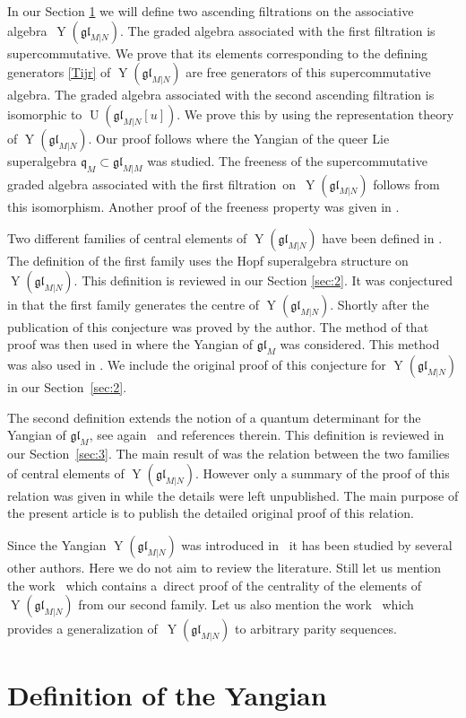 \documentclass[pdftex]{sigma}
\numberwithin{equation}{section}
\def\g{\glMN [u]}
\def\glMN{\mathfrak{gl}_{M|N}}
\def\Ug{\operatorname{U}(\g)}
\def\YMN{\operatorname{Y}(\glMN)}
\begin{document}
In our Section \ref{sec:1} we will define two ascending filtrations
on the associative algebra~$\YMN $. The
graded algebra associated with the first filtration
is supercommutative. We prove
that its elements corresponding to the defining
generators \eqref{Tijr} of $\YMN$ are free generators
of this supercommutative algebra.
The graded algebra associated with the second ascending
filtration is isomorphic to $\Ug $.
We prove this by using the representation theory of $\YMN $.
Our proof follows \cite{N2} where the Yangian of the queer Lie superalgebra
$\mathfrak{q}_{M}\subset\mathfrak{gl}_{M|M}$ was studied.
The freeness of the supercommutative graded algebra
associated with the first filtration~on~$\YMN$
follows from this isomorphism.
Another proof of the freeness property was given in \cite{G2}.

Two different families of central elements of $\YMN$
have been defined in \cite{N1}. The definition of the first family uses
the Hopf superalgebra structure on $\YMN $.
This definition is reviewed in our Section \ref{sec:2}.
It was conjectured in \cite{N1} that the first family
generates the centre of $\YMN $.
Shortly after the publication of \cite{N1}
this conjecture was proved by the author.
The method of that proof was then used in \cite{MNO}
where the Yangian of $\mathfrak{gl}_{M}$ was considered.
This method was also used in \cite{G2,N2}.
We include the original
proof of this conjecture for $\YMN$ in our Section~\ref{sec:2}.

The second definition extends the notion of a quantum determinant
for the Yangian of $\mathfrak{gl}_{M} $, see again~\cite{MNO}
and references therein. This definition is reviewed in our Section~\ref{sec:3}.
The main result of \cite{N1} was the relation between the two
families of central elements of $\YMN $. However only a summary of
the proof of this relation was given in \cite{N1}
while the details were left unpublished.
The main purpose of the present article is to publish the detailed original
proof of this relation.

Since the Yangian $\YMN$ was introduced in~\cite{N1} it has been studied
by several other authors. Here
we do not aim to review the literature.
Still let us mention the work~\cite{G1}
which contains a~direct proof of the centrality
of the elements of~$\YMN$ from our second family.
Let us also mention the work~\cite{T} which
provides a generalization of~$\YMN$ to arbitrary parity sequences.

\section{Definition of the Yangian}\label{sec:1}
\end{document}
